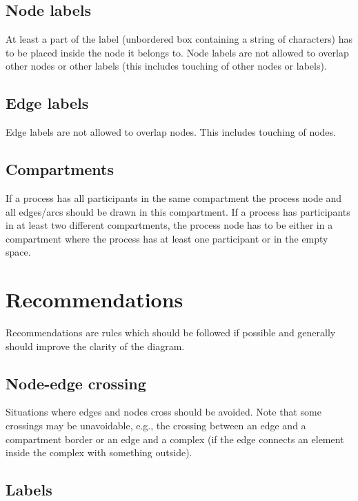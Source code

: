 \subsection{Node labels}

At least a part of the label (unbordered box containing a string of characters) has to be placed inside the node it belongs to. Node labels are not allowed to overlap other nodes or other labels (this includes touching of other nodes or labels).

\subsection{Edge labels}

Edge labels are not allowed to overlap nodes. This includes touching
of nodes.

\subsection{Compartments}

If a process has all participants in the same compartment the process node and all edges/arcs should be drawn in this compartment.  If a process has participants in at least two different compartments, the process node has to be either in a compartment where the process has at least one participant or in the empty space.

\section{Recommendations}

Recommendations are rules which should be followed if possible and generally should improve the clarity of the diagram.

\subsection{Node-edge crossing}
\label{sec:crosEdNo}

Situations where edges and nodes cross should be avoided. Note that some crossings may be unavoidable, e.g., the crossing between an edge and a compartment border or an edge and a complex (if the edge connects an element inside the complex with something outside).

\subsection{Labels}

